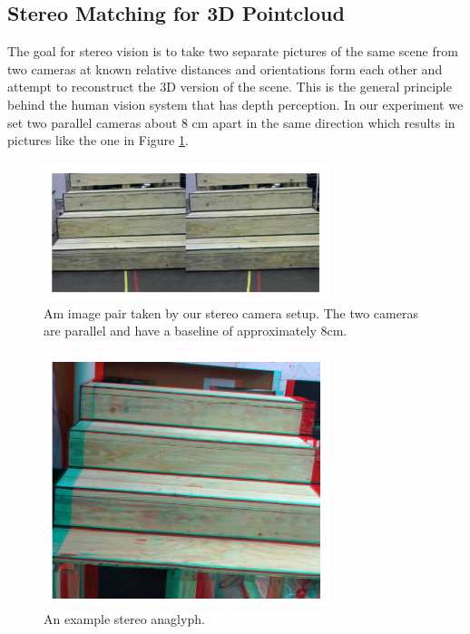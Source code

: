 \subsection{Stereo Matching for 3D Pointcloud} \label{stereo-matching-section}
The goal for stereo vision is to take two separate pictures of the same scene from two cameras at known relative distances and orientations form each other and attempt to reconstruct the 3D version of the scene. This is the general principle behind the human vision system that has depth perception. In our experiment we set two parallel cameras about 8 cm apart in the same direction which results in pictures like the one in Figure \ref{stereo-image-pair}.
\begin{figure}[!h]
\centering
\includegraphics[width=3.3in]{Sections/Figures/example_stereo_pair.jpg}
\caption{Am image pair taken by our stereo camera setup. The two cameras are parallel and have a baseline of approximately 8cm.}
\label{stereo-image-pair}
\end{figure}

\begin{figure}[!h]
\centering
\includegraphics[width=3.3in]{Sections/Figures/stereo_anaglyph.png}
\caption{An example stereo anaglyph.}
\label{stereo-anaglyph}
\end{figure}

